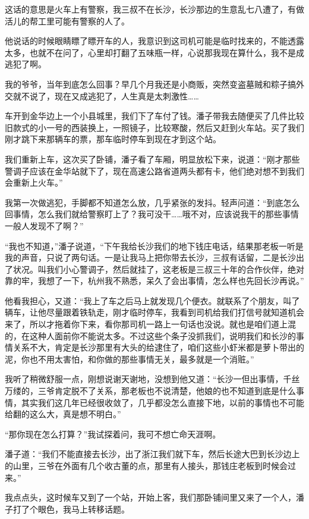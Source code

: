 这话的意思是火车上有警察，我三叔不在长沙，长沙那边的生意乱七八遭了，有做活儿的帮工里可能有警察的人了。

他说话的时候眼睛瞟了瞟开车的人，我意识到这司机可能是临时找来的，不能透露太多，也就不在问了，心里却打翻了五味瓶一样，心说那我现在算什么，我不是成逃犯了啊。

我的爷爷，当年到底怎么回事？早几个月我还是小商贩，突然变盗墓贼和粽子搞外交就不说了，现在又成逃犯了，人生真是太刺激性……

车开到金华边上一个小县城里，我们下了车付了钱。潘子带我去随便买了几件比较旧款式的小一号的西装换上，一照镜子，比较寒酸，然后又赶到火车站。买了我们刚才跳下来那辆车的票，那车临时停车到现在才到这个站。

我们重新上车，这次买了卧铺，潘子看了车厢，明显放松下来，说道：“刚才那些警调子应该在金华站就下了，现在高速公路省道两头都有卡，他们绝对想不到我们会重新上火车。”

我第一次做逃犯，手脚都不知道怎么放，几乎紧张的发抖。轻声问道：“到底怎么回事情，怎么我们就给警察盯上了？我可没干……哦不对，应该说我干的那些事情一般人发现不了啊？”

“我也不知道，”潘子说道，“下午我给长沙我们的地下钱庄电话，结果那老板一听是我的声音，只说了两句话。一是让我马上把你带去长沙，三叔有话留，二是长沙出了状况。叫我们小心警调子，然后就挂了，这老板是三叔三十年的合作伙伴，绝对靠的牢，我想了一下，杭州我不熟悉，呆久了会出事情，怎么样也先回长沙再说。”

他看我担心，又道：“我上了车之后马上就发现几个便衣。就联系了个朋友，叫了辆车，让他尽量跟着铁轨走，刚才临时停车，我看到司机给我们打信号就知道机会来了，所以才拖着你下来，看你那司机一路上一句话也没说。就也是咱们道上混的，在这种人面前你不能说太多。不过这些个条子没抓我们，说明我们和长沙的事情关系不大，肯定是长沙那里有大头的给逮住了，咱们这些小虾米都是萝卜带出的泥，你也不用太害怕，和你做的那些事情无关，最多就是一个消赃。”

我听了稍微舒服一点，刚想说谢天谢地，没想到他又道：“长沙一但出事情，千丝万缕的，三爷肯定脱不了关系，那老板也不说清楚，他娘的也不知道到底是什么事情，其实我们这几年已经很收敛了，几乎都没怎么直接下地，以前的事情也不可能给翻的这么大，真是想不明白。”

“那你现在怎么打算？”我试探着问，我可不想亡命天涯啊。

潘子道：“我们不能直接去长沙，出了浙江我们就下车，然后长途大巴到长沙边上的山里，三爷在外面有几个收古董的点，那里有人接头，那钱庄老板到时候会过来。”

我点点头，这时候车又到了一个站，开始上客，我们那卧铺间里又来了一个人，潘子打了个眼色，我马上转移话题。

